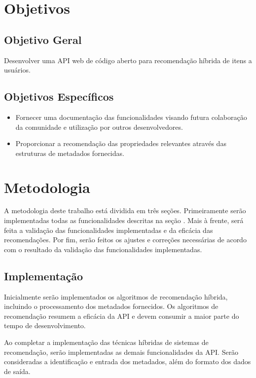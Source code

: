 \documentclass[12pt, openright, oneside, a4paper, brazil]{abntex2}
\begin{document}
\section{Objetivos} \label{objectives}

\subsection{Objetivo Geral}

Desenvolver uma API web de código aberto para recomendação híbrida de itens a usuários.

\subsection{Objetivos Específicos}

\begin{itemize}
	\item Fornecer uma documentação das funcionalidades visando futura colaboração da comunidade e utilização por outros desenvolvedores.

	\item Proporcionar a recomendação das propriedades relevantes através das estruturas de metadados fornecidas.
\end{itemize}

\section{Metodologia}

A metodologia deste trabalho está dividida em três seções. Primeiramente serão implementadas todas as funcionalidades descritas na seção . Mais à frente, será feita a validação das funcionalidades implementadas e da eficácia das recomendações. Por fim, serão feitos os ajustes e correções necessárias de acordo com o resultado da validação das funcionalidades implementadas.

\subsection{Implementação}

Inicialmente serão implementados os algoritmos de recomendação híbrida, incluindo o processamento dos metadados fornecidos. Os algoritmos de recomendação resumem a eficácia da API e devem consumir a maior parte do tempo de desenvolvimento.

Ao completar a implementação das técnicas híbridas de sistemas de recomendação, serão implementadas as demais funcionalidades da API. Serão consideradas a identificação e entrada dos metadados, além do formato dos dados de saída.
\end{document}
